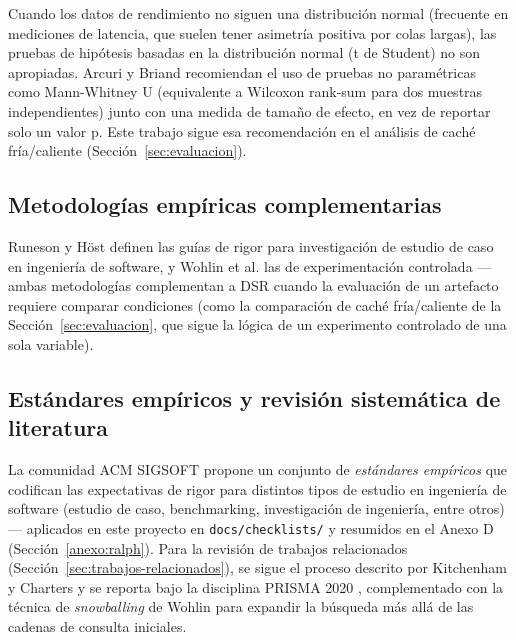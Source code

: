 Cuando los datos de rendimiento no siguen una distribución normal (frecuente en mediciones de latencia,
que suelen tener asimetría positiva por colas largas), las pruebas de hipótesis basadas en la
distribución normal (t de Student) no son apropiadas. Arcuri y Briand \cite{arcuri2011} recomiendan el
uso de pruebas no paramétricas como Mann-Whitney U (equivalente a Wilcoxon rank-sum para dos muestras
independientes) junto con una medida de tamaño de efecto, en vez de reportar solo un valor p. Este
trabajo sigue esa recomendación en el análisis de caché fría/caliente (Sección~\ref{sec:evaluacion}).

\subsection{Metodologías empíricas complementarias}

Runeson y Höst \cite{runeson2009} definen las guías de rigor para investigación de estudio de caso en
ingeniería de software, y Wohlin et al. \cite{wohlin2012} las de experimentación controlada --- ambas
metodologías complementan a DSR cuando la evaluación de un artefacto requiere comparar condiciones
(como la comparación de caché fría/caliente de la Sección~\ref{sec:evaluacion}, que sigue la lógica de un
experimento controlado de una sola variable).

\subsection{Estándares empíricos y revisión sistemática de literatura}

La comunidad ACM SIGSOFT propone un conjunto de \textit{estándares empíricos} \cite{ralph2021} que
codifican las expectativas de rigor para distintos tipos de estudio en ingeniería de software (estudio de
caso, benchmarking, investigación de ingeniería, entre otros) --- aplicados en este proyecto en
\texttt{docs/checklists/} y resumidos en el Anexo D (Sección~\ref{anexo:ralph}). Para la revisión de trabajos relacionados
(Sección~\ref{sec:trabajos-relacionados}), se sigue el proceso descrito por Kitchenham y Charters
\cite{kitchenham2007} y se reporta bajo la disciplina PRISMA 2020 \cite{page2021}, complementado con la
técnica de \textit{snowballing} de Wohlin \cite{wohlin2014ease} para expandir la búsqueda más allá de las
cadenas de consulta iniciales.
\newpage
